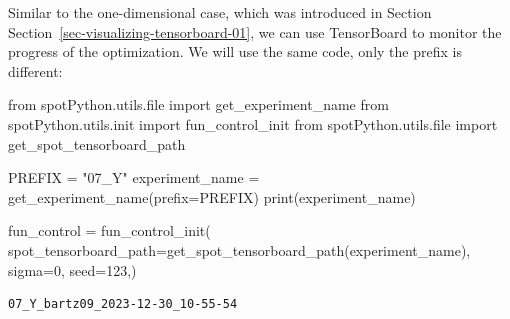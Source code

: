 \documentclass[
  letterpaper,
  DIV=11,
  numbers=noendperiod]{scrreprt}
\newenvironment{Shaded}{\begin{snugshade}}{\end{snugshade}}
\newcommand{\BuiltInTok}[1]{\textcolor[rgb]{0.00,0.23,0.31}{#1}}
\newcommand{\DecValTok}[1]{\textcolor[rgb]{0.68,0.00,0.00}{#1}}
\newcommand{\ImportTok}[1]{\textcolor[rgb]{0.00,0.46,0.62}{#1}}
\newcommand{\NormalTok}[1]{\textcolor[rgb]{0.00,0.23,0.31}{#1}}
\newcommand{\OperatorTok}[1]{\textcolor[rgb]{0.37,0.37,0.37}{#1}}
\newcommand{\StringTok}[1]{\textcolor[rgb]{0.13,0.47,0.30}{#1}}
\begin{document}
\begin{tcolorbox}[enhanced jigsaw, arc=.35mm, colback=white, bottomtitle=1mm, toprule=.15mm, coltitle=black, titlerule=0mm, leftrule=.75mm, title=\textcolor{quarto-callout-note-color}{\faInfo}\hspace{0.5em}{TensorBoard}, opacitybacktitle=0.6, breakable, colbacktitle=quarto-callout-note-color!10!white, opacityback=0, toptitle=1mm, rightrule=.15mm, left=2mm, colframe=quarto-callout-note-color-frame, bottomrule=.15mm]

Similar to the one-dimensional case, which was introduced in Section
Section~\ref{sec-visualizing-tensorboard-01}, we can use TensorBoard to
monitor the progress of the optimization. We will use the same code,
only the prefix is different:

\begin{Shaded}
\begin{Highlighting}[]
\ImportTok{from}\NormalTok{ spotPython.utils.}\BuiltInTok{file} \ImportTok{import}\NormalTok{ get\_experiment\_name}
\ImportTok{from}\NormalTok{ spotPython.utils.init }\ImportTok{import}\NormalTok{ fun\_control\_init}
\ImportTok{from}\NormalTok{ spotPython.utils.}\BuiltInTok{file} \ImportTok{import}\NormalTok{ get\_spot\_tensorboard\_path}

\NormalTok{PREFIX }\OperatorTok{=} \StringTok{"07\_Y"}
\NormalTok{experiment\_name }\OperatorTok{=}\NormalTok{ get\_experiment\_name(prefix}\OperatorTok{=}\NormalTok{PREFIX)}
\BuiltInTok{print}\NormalTok{(experiment\_name)}

\NormalTok{fun\_control }\OperatorTok{=}\NormalTok{ fun\_control\_init(}
\NormalTok{    spot\_tensorboard\_path}\OperatorTok{=}\NormalTok{get\_spot\_tensorboard\_path(experiment\_name),}
\NormalTok{    sigma}\OperatorTok{=}\DecValTok{0}\NormalTok{,}
\NormalTok{    seed}\OperatorTok{=}\DecValTok{123}\NormalTok{,)}
\end{Highlighting}
\end{Shaded}

\begin{verbatim}
07_Y_bartz09_2023-12-30_10-55-54
\end{verbatim}

\end{tcolorbox}
\end{document}
